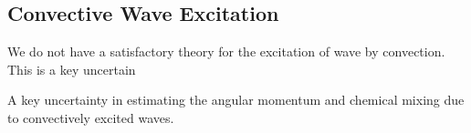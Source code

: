 {\color{purple}
\subsection{Convective Wave Excitation}
}

We do not have a satisfactory theory for the excitation of wave by convection. This is a key uncertain

A key uncertainty in estimating the angular momentum and chemical mixing due to convectively excited waves.
